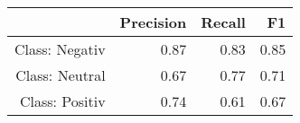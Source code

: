 \begin{table}[ht]
\centering
\begin{tabular}{rrrr}
  \hline
 & Precision & Recall & F1 \\ 
  \hline
Class: Negativ & 0.87 & 0.83 & 0.85 \\ 
  Class: Neutral & 0.67 & 0.77 & 0.71 \\ 
  Class: Positiv & 0.74 & 0.61 & 0.67 \\ 
   \hline
\end{tabular}
\end{table}
